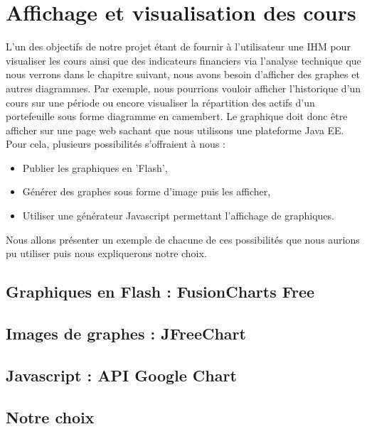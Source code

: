 \section{Affichage et visualisation des cours}

L'un des objectifs de notre projet étant de fournir à l'utilisateur une IHM pour visualiser les cours ainsi que des indicateurs financiers via l'analyse technique que nous verrons dans le chapitre suivant, nous avons besoin d'afficher des graphes et autres diagrammes.
Par exemple, nous pourrions vouloir afficher l'historique d'un cours sur une période ou encore visualiser la répartition des actifs d'un portefeuille sous forme diagramme en camembert. Le graphique doit donc être afficher sur une page web sachant que nous utilisons une plateforme Java EE.\\

Pour cela, plusieurs possibilités s'offraient à nous :
\begin{itemize}
 \item Publier les graphiques en 'Flash',
 \item Générer des graphes sous forme d'image puis les afficher,
 \item Utiliser une générateur Javascript permettant l'affichage de graphiques.
\end{itemize}

Nous allons présenter un exemple de chacune de ces possibilités que nous aurions pu utiliser puis nous expliquerons notre choix.

\subsection{Graphiques en Flash : FusionCharts Free}


\subsection{Images de graphes : JFreeChart}


\subsection{Javascript : API Google Chart}


\subsection{Notre choix}